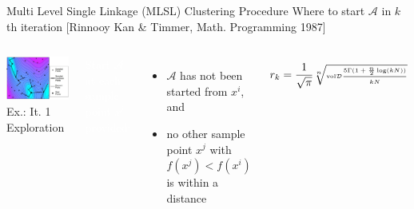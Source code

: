 \documentclass[handout,aspectratio=54]{beamer}
\numberwithin{theorem}{section}
\begin{document}
\begin{frame}{Multi Level Single Linkage (MLSL) Clustering Procedure}
\small
Where to start $\mathcal{A}$ in $k$th iteration \scriptsize\textcolor[RGB]{128,0,128}{ [Rinnooy Kan \& Timmer, Math. Programming 1987]}
\normalsize

\begin{columns}
\includegraphics[width=\textwidth]{fig/39-2.jpg}
Ex.: It. 1 Exploration

\colorbox[rgb]{0.5,0.6,0.7}{\textcolor{white}{Start $\mathcal{A}$ at each sample point}}
\colorbox[rgb]{0.5,0.6,0.7}{\textcolor{white}{$x^i$ provided:}}

\begin{itemize}
\item $\mathcal{A}$ has not been started from $x^i$, and
\item no other sample point $x^j$ with $f(x^j)<f(x^i)$ is within a distance
\end{itemize}
\begin{equation*}\tiny
r_k=\frac{1}{\sqrt{\pi}}\sqrt[n]{\textup{vol}\mathcal{D}\frac{5\Gamma(1+\frac{n}{2}\log(kN))}{kN}}
\end{equation*}
\end{columns}
\vspace{0.5cm}
\end{frame}
\end{document}
